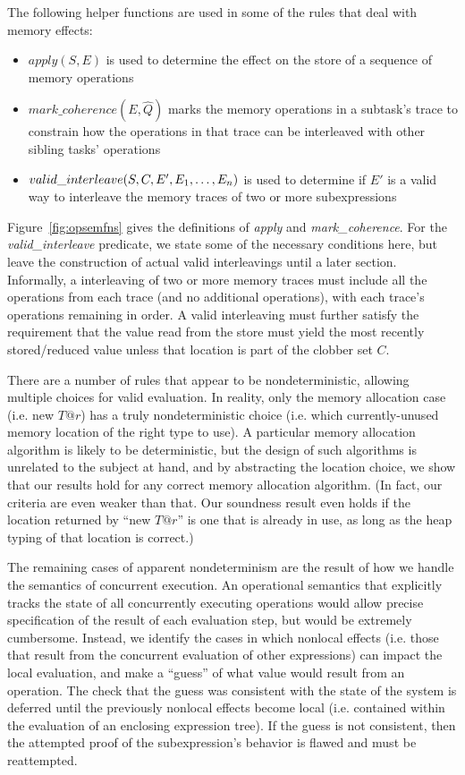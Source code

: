 \begin{itemize}
The following helper functions are used in some of the rules that deal with memory effects:
\begin{itemize}
\item $apply(S, E)$ is used to determine the effect on the store of a sequence of memory operations
\item $mark\_coherence(E, \hat Q)$ marks the memory operations in a subtask's trace to
constrain how the operations in that trace can be interleaved with other sibling tasks' operations
\item $valid\_interleave(S, C, E', {E}_1,\ldots,{E}_n)$ is used to determine if $E'$ is a valid way to
interleave the memory traces of two or more subexpressions
\end{itemize}
Figure~\ref{fig:opsemfns} gives the definitions of {\em apply} and {\em mark\_coherence}.  For
the {\em valid\_interleave} predicate, we state some of the necessary conditions here, but leave 
the construction of actual valid interleavings until a later section.  Informally, a interleaving
of two or more memory traces must include all the operations from each trace (and no additional
operations), with each trace's operations remaining in order.  A valid interleaving must further
satisfy the requirement that the value read from the store must yield the most recently 
stored/reduced value unless that location is part of the clobber set $C$.
\end{itemize}

There are a number of rules that appear to be nondeterministic, allowing multiple choices for
valid evaluation.  In reality, only the memory allocation case (i.e. new $T@r$) has a truly
nondeterministic choice (i.e. which currently-unused memory location of the right type to 
use).  A particular memory allocation algorithm is likely to be deterministic, but the
design of such algorithms is unrelated to the subject at hand, and by abstracting the location 
choice, we show that our results hold for any correct memory allocation algorithm.  (In fact,
our criteria are even weaker than that.  Our soundness result even holds if the location returned
by ``new $T@r$'' is one that is already in use, as long as the heap typing of that location is
correct.)

The remaining cases of apparent nondeterminism are the result of how we handle the semantics of
concurrent execution.  An operational semantics that explicitly tracks the state of all 
concurrently executing operations would allow precise specification of the result of each 
evaluation step, but would be extremely cumbersome.  Instead, we identify the cases in which
nonlocal effects (i.e. those that result from the concurrent evaluation of other expressions)
can impact the local evaluation, and make a ``guess'' of what value would result from an 
operation.  The check that the guess was consistent with the state of the system is deferred until
the previously nonlocal effects become local (i.e. contained within the evaluation of an enclosing
expression tree).  If the guess is not consistent, then the attempted proof of the subexpression's
behavior is flawed and must be reattempted.

